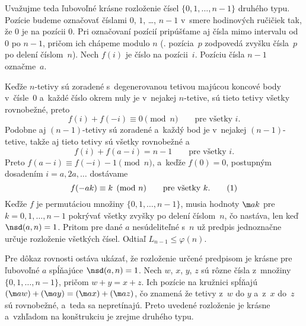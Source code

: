 {Uvažujme teda ľubovoľné krásne rozloženie čísel $\{0,1,\dots,n-1\}$ druhého typu. Pozície budeme označovať číslami $0$, $1$, \dots, $n-1$ v~smere hodinových ručičiek tak, že $0$ je na pozícii $0$. Pri označovaní pozícií pripúšťame aj čísla mimo intervalu od $0$ po $n-1$, pričom ich chápeme modulo $n$ (\tj. pozícia~$p$ zodpovedá zvyšku čísla~$p$ po delení číslom~$n$). Nech $f(i)$ je číslo na pozícii~$i$. Pozíciu čísla $n-1$ označme~$a$.

Keďže $n$-tetivy sú zoradené s~degenerovanou tetivou majúcou koncové body v~čísle~$0$ a~každé číslo okrem nuly je v~nejakej $n$-tetive, sú tieto tetivy všetky rovnobežné, preto
$$
f(i)+f(-i)\equiv0\pmod n\qquad\text{pre všetky $i$.}
$$
Podobne aj $(n-1)$-tetivy sú zoradené a~každý bod je v~nejakej $(n-1)$-tetive, takže aj tieto tetivy sú všetky rovnobežné a
$$
f(i)+f(a-i) = n-1\qquad\text{pre všetky $i$.}
$$
Preto $f(a-i)\equiv f(-i)-1\pmod n$, a~keďže $f(0)=0$, postupným dosadením $i=a,2a,\dots$ dostávame
$$
f(-ak) \equiv k\pmod n\qquad\text{pre všetky $k$.}
\tag1
$$
Keďže $f$ je permutáciou množiny $\{0,1,\dots,n-1\}$, musia hodnoty $\m ak$ pre $k=0,1,\dots,n-1$ pokrývať všetky zvyšky po delení číslom~$n$, čo nastáva, len keď $\nsd(a,n) =1$. Pritom pre dané $a$ nesúdeliteľné s~$n$ už predpis  jednoznačne určuje rozloženie všetkých čísel. Odtiaľ $L_{n-1}\le \varphi(n)$.

Pre dôkaz rovnosti ostáva ukázať, že rozloženie určené predpisom  je krásne pre ľubovoľné $a$ spĺňajúce $\nsd(a,n)=1$. Nech $w$, $x$, $y$, $z$ sú rôzne čísla z~množiny $\{0,1,\dots,n-1\}$, pričom $w+y=x+z$. Ich pozície na kružnici spĺňajú $(\m aw)+(\m ay)=(\m ax)+(\m az)$, čo znamená že tetivy z~$w$ do $y$ a~z~$x$ do~$z$ sú rovnobežné, a~teda sa nepretínajú. Preto uvedené rozloženie je krásne a~vzhľadom na konštrukciu je zrejme druhého typu.}

